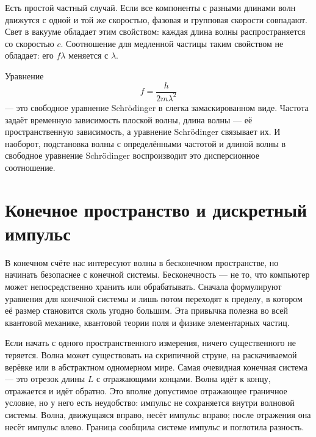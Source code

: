 Есть простой частный случай. Если все компоненты с разными длинами волн движутся с одной и той же скоростью, фазовая и групповая скорости совпадают. Свет в вакууме обладает этим свойством: каждая длина волны распространяется со скоростью \(c\). Соотношение для медленной частицы таким свойством не обладает: его \(f\lambda\) меняется с \(\lambda\).

Уравнение
\begin{equation}
f=\frac{h}{2m\lambda^2}
\end{equation}
— это свободное уравнение Schr\"odinger в слегка замаскированном виде. Частота задаёт временную зависимость плоской волны, длина волны — её пространственную зависимость, а уравнение Schr\"odinger связывает их. И наоборот, подстановка волны с определёнными частотой и длиной волны в свободное уравнение Schr\"odinger воспроизводит это дисперсионное соотношение.

\begin{classroomqa}
\end{classroomqa}

\section{Конечное пространство и дискретный импульс}

В конечном счёте нас интересуют волны в бесконечном пространстве, но начинать безопаснее с конечной системы. Бесконечность — не то, что компьютер может непосредственно хранить или обрабатывать. Сначала формулируют уравнения для конечной системы и лишь потом переходят к пределу, в котором её размер становится сколь угодно большим. Эта привычка полезна во всей квантовой механике, квантовой теории поля и физике элементарных частиц.

Если начать с одного пространственного измерения, ничего существенного не теряется. Волна может существовать на скрипичной струне, на раскачиваемой верёвке или в абстрактном одномерном мире. Самая очевидная конечная система — это отрезок длины \(L\) с отражающими концами. Волна идёт к концу, отражается и идёт обратно. Это вполне допустимое отражающее граничное условие, но у него есть неудобство: импульс не сохраняется внутри волновой системы. Волна, движущаяся вправо, несёт импульс вправо; после отражения она несёт импульс влево. Граница сообщила системе импульс и поглотила разность.

